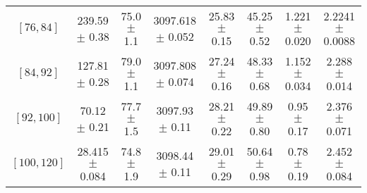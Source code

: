 \begin{tabular}{c||c|c|c|c|c|c|c}
$[76, 84]$ & 239.59 $\pm$ 0.38 & 75.0 $\pm$ 1.1 & 3097.618 $\pm$ 0.052 & 25.83 $\pm$ 0.15 & 45.25 $\pm$ 0.52 & 1.221 $\pm$ 0.020 & 2.2241 $\pm$ 0.0088\\
$[84, 92]$ & 127.81 $\pm$ 0.28 & 79.0 $\pm$ 1.1 & 3097.808 $\pm$ 0.074 & 27.24 $\pm$ 0.16 & 48.33 $\pm$ 0.68 & 1.152 $\pm$ 0.034 & 2.288 $\pm$ 0.014\\
$[92, 100]$ & 70.12 $\pm$ 0.21 & 77.7 $\pm$ 1.5 & 3097.93 $\pm$ 0.11 & 28.21 $\pm$ 0.22 & 49.89 $\pm$ 0.80 & 0.95 $\pm$ 0.17 & 2.376 $\pm$ 0.071\\
$[100, 120]$ & 28.415 $\pm$ 0.084 & 74.8 $\pm$ 1.9 & 3098.44 $\pm$ 0.11 & 29.01 $\pm$ 0.29 & 50.64 $\pm$ 0.98 & 0.78 $\pm$ 0.19 & 2.452 $\pm$ 0.084\\
\end{tabular}

